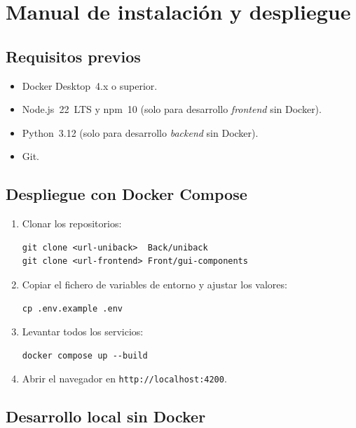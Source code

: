 
\chapter{Manual de instalación y despliegue}
\label{ap:instalacion}

\section{Requisitos previos}
\label{ap:requisitos}

\begin{itemize}
  \item Docker Desktop~4.x o superior.
  \item Node.js~22~LTS y npm~10 (solo para desarrollo \textit{frontend} sin Docker).
  \item Python~3.12 (solo para desarrollo \textit{backend} sin Docker).
  \item Git.
\end{itemize}

\section{Despliegue con Docker Compose}
\label{ap:docker}

\begin{enumerate}
  \item Clonar los repositorios:
\begin{verbatim}
git clone <url-uniback>  Back/uniback
git clone <url-frontend> Front/gui-components
\end{verbatim}
  \item Copiar el fichero de variables de entorno y ajustar los valores:
\begin{verbatim}
cp .env.example .env
\end{verbatim}
  \item Levantar todos los servicios:
\begin{verbatim}
docker compose up --build
\end{verbatim}
  \item Abrir el navegador en \texttt{http://localhost:4200}.
\end{enumerate}

\section{Desarrollo local sin Docker}
\label{ap:dev-local}

